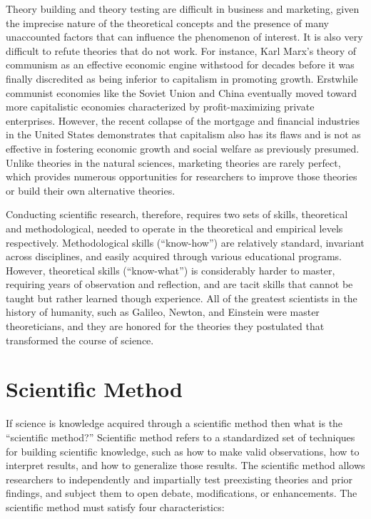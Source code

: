 Theory building and theory testing are difficult in business and marketing, given the imprecise nature of the theoretical concepts and the presence of many unaccounted factors that can influence the phenomenon of interest. It is also very difficult to refute theories that do not work. For instance, Karl Marx's theory of communism as an effective economic engine withstood for decades before it was finally discredited as being inferior to capitalism in promoting growth. Erstwhile communist economies like the Soviet Union and China eventually moved toward more capitalistic economies characterized by profit-maximizing private enterprises. However, the recent collapse of the mortgage and financial industries in the United States demonstrates that capitalism also has its flaws and is not as effective in fostering economic growth and social welfare as previously presumed. Unlike theories in the natural sciences, marketing theories are rarely perfect, which provides numerous opportunities for researchers to improve those theories or build their own alternative theories.

Conducting scientific research, therefore, requires two sets of skills, theoretical and methodological, needed to operate in the theoretical and empirical levels respectively. Methodological skills (``know-how'') are relatively standard, invariant across disciplines, and easily acquired through various educational programs. However, theoretical skills (``know-what'') is considerably harder to master, requiring years of observation and reflection, and are tacit skills that cannot be taught but rather learned though experience. All of the greatest scientists in the history of humanity, such as Galileo, Newton, and Einstein were master theoreticians, and they are honored for the theories they postulated that transformed the course of science.

\section{Scientific Method}

If science is knowledge acquired through a scientific method then what is the ``scientific method?'' Scientific method refers to a standardized set of techniques for building scientific knowledge, such as how to make valid observations, how to interpret results, and how to generalize those results. The scientific method allows researchers to independently and impartially test preexisting theories and prior findings, and subject them to open debate, modifications, or enhancements. The scientific method must satisfy four characteristics:

